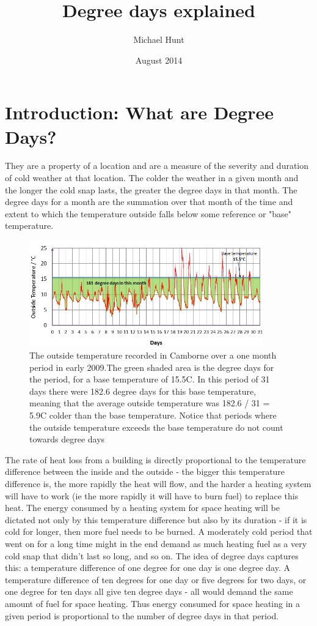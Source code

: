 \documentclass{article}
\title{Degree days explained}
\author{Michael Hunt}
\date{August 2014}
\begin{document}
\maketitle


\section{Introduction: What are Degree Days?}

They are a property of a location and are a measure of the severity and duration of cold weather at that location. The colder the weather in a given month and the longer the cold snap lasts, the greater the degree days in that month. The degree days for a month are the summation over that month of the time and extent to which the temperature outside falls below some reference or "base" temperature.

\begin{figure}[ht]
\includegraphics[width=0.9\textwidth]{one_month_BT15pt5}
\caption{The outside temperature recorded in Camborne over a one month period in early 2009.The green shaded area is the degree days for the period, for a base temperature of 15.5\degree C. In this period of 31 days there were 182.6 degree days for this base temperature, meaning that the average outside temperature was 182.6 / 31 = 5.9\degree C colder than the base temperature. Notice that periods where the outside temperature exceeds the base temperature do not count towards degree days}
\label{fig:DDdata}
\end{figure}


The rate of heat loss from a building is directly proportional to the temperature difference between the inside and the outside - the bigger this temperature difference is, the more rapidly the heat will flow, and the harder a heating system will have to work (ie the more rapidly it will have to burn fuel)  to replace this heat. The energy consumed by a heating system for space heating will be dictated not only by this temperature difference but also by its duration - if it is cold for longer, then more fuel needs to be burned. A moderately cold period that went on for a long time might in the end demand as much heating fuel as a very cold snap that didn't last so long, and so on. The idea of degree days captures this: a temperature difference of one degree for one day is one degree day. A temperature difference of ten degrees for one day or five degrees for two days, or one degree for ten days all give ten degree days - all would demand the same amount of fuel for space heating. Thus energy consumed for space heating in a given period is proportional to the number of degree days in that period.
\end{document}
